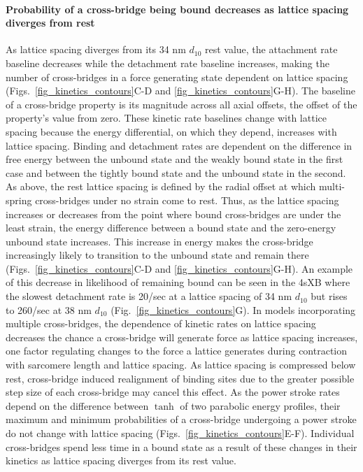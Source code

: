 \documentclass[]{article}
\begin{document}
\paragraph{Probability of a cross-bridge being bound decreases as lattice spacing diverges from rest} %
As lattice spacing diverges from its 34 nm $d_{10}$ rest value, the attachment rate baseline decreases while the detachment rate baseline increases, making the number of cross-bridges in a force generating state dependent on lattice spacing (Figs.~\ref{fig_kinetics_contours}C-D and \ref{fig_kinetics_contours}G-H). 
The baseline of a cross-bridge property is its magnitude across all axial offsets, the offset of the property's value from zero. 
These kinetic rate baselines change with lattice spacing because the energy differential, on which they depend, increases with lattice spacing.
Binding and detachment rates are dependent on the difference in free energy between the unbound state and the weakly bound state in the first case and between the tightly bound state and the unbound state in the second.
As above, the rest lattice spacing is defined by the radial offset at which multi-spring cross-bridges under no strain come to rest. 
Thus, as the lattice spacing increases or decreases from the point where bound cross-bridges are under the least strain, the energy difference between a bound state and the zero-energy unbound state increases. 
This increase in energy makes the cross-bridge increasingly likely to transition to the unbound state and remain there (Figs.~\ref{fig_kinetics_contours}C-D and  \ref{fig_kinetics_contours}G-H). 
An example of this decrease in likelihood of remaining bound can be seen in the 4sXB where the slowest detachment rate is 20/sec at a lattice spacing of 34 nm $d_{10}$ but rises to 260/sec at 38 nm $d_{10}$ (Fig.~\ref{fig_kinetics_contours}G).
In models incorporating multiple cross-bridges, the dependence of kinetic rates on lattice spacing decreases the chance a cross-bridge will generate force as lattice spacing increases, one factor regulating changes to the force a lattice generates during contraction with sarcomere length and lattice spacing.
As lattice spacing is compressed below rest, cross-bridge induced realignment of binding sites due to the greater possible step size of each cross-bridge may cancel this effect.
As the power stroke rates depend on the difference between $\tanh$ of two parabolic energy profiles, their maximum and minimum probabilities of a cross-bridge undergoing a power stroke do not change with lattice spacing (Figs.~\ref{fig_kinetics_contours}E-F). 
Individual cross-bridges spend less time in a bound state as a result of these changes in their kinetics as lattice spacing diverges from its rest value.
\end{document}
